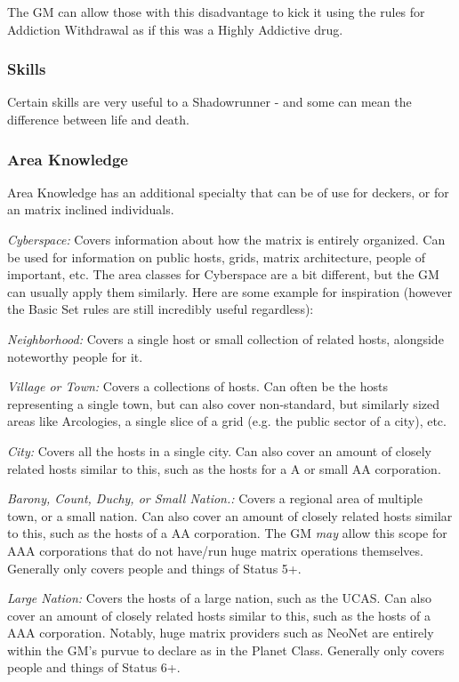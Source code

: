 \begin{multicols*}{3}
	The GM can allow those with this disadvantage to kick it using the rules for Addiction Withdrawal as if this was a Highly Addictive drug.
	
	\subsubsection{Skills}
	
	Certain skills are very useful to a Shadowrunner - and some can mean the difference between life and death.
	
	\subsubsection*{Area Knowledge}
	
	Area Knowledge has an additional specialty that can be of use for deckers, or for an matrix inclined individuals.
	
	\textit{Cyberspace:} Covers information about how the matrix is entirely organized. Can be used for information on public hosts, grids, matrix architecture, people of important, etc. The area classes for Cyberspace are a bit different, but the GM can usually apply them similarly. Here are some example for inspiration (however the Basic Set rules are still incredibly useful regardless):
	
	\textit{Neighborhood:} Covers a single host or small collection of related hosts, alongside noteworthy people for it.
	
	\textit{Village or Town:} Covers a collections of hosts. Can often be the hosts representing a single town, but can also cover non-standard, but similarly sized areas like Arcologies, a single slice of a grid (e.g. the public sector of a city), etc. 
	
	\textit{City:} Covers all the hosts in a single city. Can also cover an amount of closely related hosts similar to this, such as the hosts for a A or small AA corporation.
	
	\textit{Barony, Count, Duchy, or Small Nation.:} Covers a regional area of multiple town, or a small nation. Can also cover an amount of closely related hosts similar to this, such as the hosts of a AA corporation. The GM \textit{may} allow this scope for AAA corporations that do not have/run huge matrix operations themselves. Generally only covers people and things of Status 5+.
	
	\textit{Large Nation:} Covers the hosts of a large nation, such as the UCAS. Can also cover an amount of closely related hosts similar to this, such as the hosts of a AAA corporation. Notably, huge matrix providers such as NeoNet are entirely within the GM's purvue to declare as in the Planet Class. Generally only covers people and things of Status 6+.
	

\end{multicols*}
